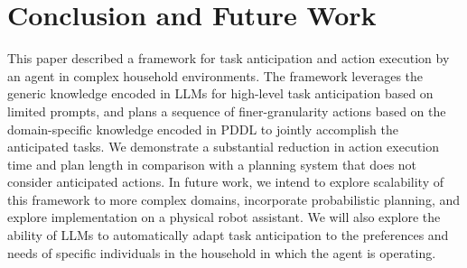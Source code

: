 \section{Conclusion and Future Work}
This paper described a framework for task anticipation and action execution by an agent in complex household environments. The framework leverages the generic knowledge encoded in LLMs for high-level task anticipation based on limited prompts, and plans a sequence of finer-granularity actions based on the domain-specific knowledge encoded in PDDL to jointly accomplish the anticipated tasks. We demonstrate a substantial reduction in action execution time and plan length in comparison with a planning system that does not consider anticipated actions. In future work, we intend to explore scalability of this framework to more complex domains, incorporate probabilistic planning, and explore implementation on a physical robot assistant. We will also explore the ability of LLMs to automatically adapt task anticipation to the preferences and needs of specific individuals in the household in which the agent is operating. 




